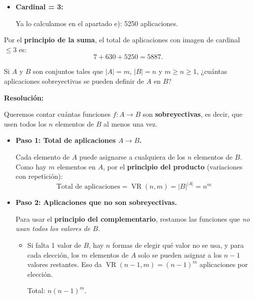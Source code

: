 \documentclass[a4paper,12pt]{article}
\begin{document}
    \begin{ejercicio}[title=Ejercicio 20]
    \begin{itemize}

    \item \textbf{Cardinal = 3:}

    Ya lo calculamos en el apartado e): 5250 aplicaciones.

\end{itemize}

Por el \textbf{principio de la suma}, el total de aplicaciones con imagen de cardinal $\le 3$ es:
\[
7 + 630 + 5250 = \boxed{5887}.
\]

\end{ejercicio}

\begin{ejercicio}[title=Ejercicio 21 (⋆)]
Si $A$ y $B$ son conjuntos tales que $|A| = m$, $|B| = n$ y $m \ge n \ge 1$, ¿cuántas aplicaciones sobreyectivas se pueden definir de $A$ en $B$?

\tcblower
\textbf{Resolución:}

Queremos contar cuántas funciones $f : A \to B$ son \textbf{sobreyectivas}, es decir, que usen todos los $n$ elementos de $B$ al menos una vez.

\begin{itemize}

\item \textbf{Paso 1: Total de aplicaciones $A \to B$.}  

Cada elemento de $A$ puede asignarse a cualquiera de los $n$ elementos de $B$. Como hay $m$ elementos en $A$, por el \textbf{principio del producto} (variaciones con repetición):
\[
\text{Total de aplicaciones} = \operatorname{VR}(n,m) = |B|^{|A|} = n^m
\]

\item \textbf{Paso 2: Aplicaciones que no son sobreyectivas.}  

Para usar el \textbf{principio del complementario}, restamos las funciones que \emph{no usan todos los valores de $B$}.

\begin{itemize}

\item Si falta 1 valor de $B$, hay $n$ formas de elegir qué valor no se usa, y para cada elección, los $m$ elementos de $A$ solo se pueden asignar a los $n-1$ valores restantes. Eso da $\operatorname{VR}(n-1,m)=(n-1)^m$ aplicaciones por elección.

Total: $n(n-1)^m$.


\end{itemize}
\end{itemize}
\end{ejercicio}
\end{document}
